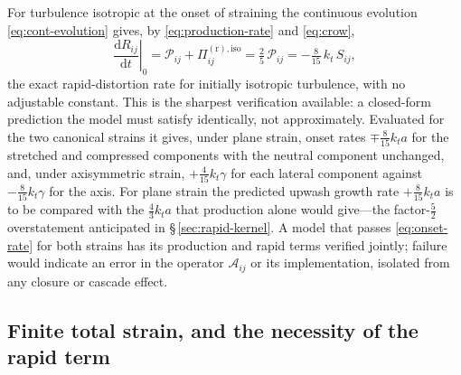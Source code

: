\documentclass[11pt,a4paper]{article}
\begin{document}
For turbulence isotropic at the onset of straining the continuous
evolution \eqref{eq:cont-evolution} gives, by
\eqref{eq:production-rate} and \eqref{eq:crow},
\begin{equation}
  \left.\frac{\mathrm{d}R_{ij}}{\mathrm{d}t}\right|_{0}
  = \mathcal{P}_{ij}+\Pi^{(\mathrm r),\mathrm{iso}}_{ij}
  = \tfrac{2}{5}\,\mathcal{P}_{ij}
  = -\tfrac{8}{15}\,k_t\,S_{ij},
  \label{eq:onset-rate}
\end{equation}
the exact rapid-distortion rate for initially isotropic turbulence, with
no adjustable constant. This is the sharpest verification available: a
closed-form prediction the model must satisfy identically, not
approximately. Evaluated for the two canonical strains it gives, under
plane strain, onset rates $\mp\tfrac{8}{15}k_ta$ for the stretched and
compressed components with the neutral component unchanged, and, under
axisymmetric strain, $+\tfrac{4}{15}k_t\gamma$ for each lateral
component against $-\tfrac{8}{15}k_t\gamma$ for the axis. For plane
strain the predicted upwash growth rate $+\tfrac{8}{15}k_ta$ is to be
compared with the $\tfrac43k_ta$ that production alone would give---the
factor-$\tfrac52$ overstatement anticipated in
\S\,\ref{sec:rapid-kernel}. A model that passes \eqref{eq:onset-rate}
for both strains has its production and rapid terms verified jointly;
failure would indicate an error in the operator $\mathcal{A}_{ij}$ or
its implementation, isolated from any closure or cascade effect.

\subsection{Finite total strain, and the necessity of the rapid term}
\label{sec:finite-strain}
\end{document}
